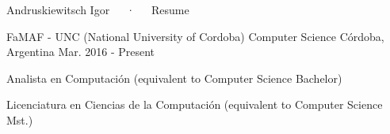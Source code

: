 \documentclass[10pt, a4paper]{resume}
\begin{document}
\makecvheader[L]

\makecvfooter
  { }
  {Andruskiewitsch Igor~~~·~~~Resume}
  {\thepage}



\begin{cventries}

  \cventry
    {FaMAF - UNC (National University of Cordoba)}
    {Computer Science}
    {Córdoba, Argentina}
    {Mar. 2016 - Present}
    {
      \begin{cvitems}
      \item {Analista en Computación (equivalent to Computer Science Bachelor)}
      \item{Licenciatura en Ciencias de la Computación (equivalent to Computer Science Mst.)}
      \end{cvitems}
    }

\end{cventries}



\end{document}
